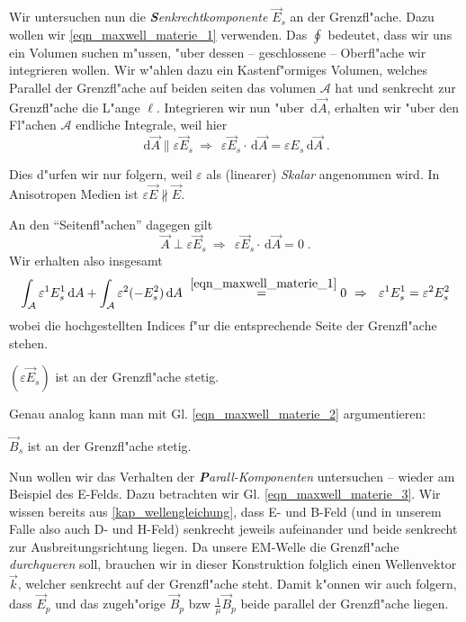 \documentclass[twoside,a4paper]{book}
\newcommand{\st}[1]{{\slshape \textbf #1}}
\newcommand{\diff}{\ensuremath{\, \mathrm{d}}}
\newcommand{\Folgt}{\ensuremath{~ \Rightarrow ~ ~ }}
\newcommand{\abs}[0]{\bigskip \noindent}
\begin{document}
Wir untersuchen nun die \st{Senkrechtkomponente} $\vec E_s$ an der
Grenzfl"ache. Dazu wollen wir \eqref{eqn_maxwell_materie_1}
verwenden. Das $\oint$ bedeutet, dass wir uns ein Volumen suchen
m"ussen, "uber dessen -- geschlossene -- Oberfl"ache wir integrieren
wollen. Wir w"ahlen dazu ein Kastenf"ormiges Volumen, welches Parallel
der Grenzfl"ache auf beiden seiten das volumen $\mathcal A$ hat und
senkrecht zur Grenzfl"ache die L"ange $\ell$. Integrieren wir nun
"uber $\diff \vec A$, erhalten wir "uber den Fl"achen $\mathcal A$
endliche Integrale, weil hier
\begin{equation*}
   \diff \vec A \parallel \varepsilon\vec E_s  \Folgt \varepsilon\vec E_s \cdot \diff \vec A
   = \varepsilon E_s \diff \vec A \;.
\end{equation*}
\begin{Wichtig}
   Dies d"urfen wir nur folgern, weil $\varepsilon$ als (linearer)
   \emph{Skalar} angenommen wird. In Anisotropen Medien ist
   $\varepsilon\vec E \not\parallel \vec E$.
\end{Wichtig}
An den "`Seitenfl"achen"' dagegen gilt
\begin{equation*}
   \vec A \perp \varepsilon \vec E_s \Folgt \varepsilon\vec E_s \cdot
   \diff \vec A = 0 \;.
\end{equation*}
Wir erhalten also insgesamt
\begin{equation}
   \int_{\mathcal A} \varepsilon^1 E_s^1 \diff A + 
   \int_{\mathcal A} \varepsilon^2 (- E_s^2) \diff A 
\stackrel{~\eqref{eqn_maxwell_materie_1}}{=} 0
\Folgt
\varepsilon^1 E^1_s = \varepsilon^2 E^2_s
\end{equation}
wobei die hochgestellten Indices f"ur die entsprechende Seite der
Grenzfl"ache stehen.
\begin{Wichtig}
   $(\varepsilon \vec E_s)$ ist an der Grenzfl"ache stetig.
\end{Wichtig}

\abs
Genau analog kann man mit Gl. \eqref{eqn_maxwell_materie_2}
argumentieren:
\begin{Wichtig}
   $\vec B_s$ ist an der Grenzfl"ache stetig.
\end{Wichtig}

\abs Nun wollen wir das Verhalten der \st{Parall-Komponenten} untersuchen
-- wieder am Beispiel des E-Felds. Dazu betrachten wir
Gl. \eqref{eqn_maxwell_materie_3}. Wir wissen bereits aus
\ref{kap_wellengleichung}, dass E- und B-Feld (und in unserem Falle
also auch D- und H-Feld) senkrecht jeweils aufeinander und beide
senkrecht zur Ausbreitungsrichtung liegen. Da unsere EM-Welle die
Grenzfl"ache \emph{durchqueren} soll, brauchen wir in dieser
Konstruktion folglich einen Wellenvektor $\vec k$, welcher senkrecht
auf der Grenzfl"ache steht. Damit k"onnen wir auch folgern, dass $\vec
E_p$ und das zugeh"orige $\vec B_p$ bzw $\frac{1}{\mu} \vec B_p$ beide
parallel der Grenzfl"ache liegen. 
\end{document}
